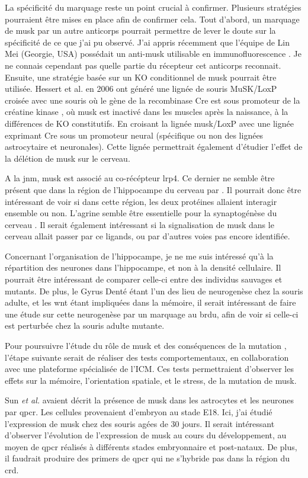 La spécificité du marquage reste un point crucial à confirmer. Plusieurs stratégies pourraient être mises en place afin de confirmer cela. Tout d'abord, un marquage de \gls{musk} par un autre anticorps pourrait permettre de lever le doute sur la spécificité de ce que j'ai pu observé. J'ai appris récemment que l'équipe de Lin Mei (Georgie, USA) possédait un anti-\gls{musk} utilisable en immunofluorescence \cite{Amenta2012}. Je ne connais cependant pas quelle partie du récepteur cet anticorps reconnait. Ensuite, une stratégie basée sur un KO conditionnel de \gls{musk} pourrait être utilisée. Hessert et al. en 2006 ont généré une lignée de souris MuSK/LoxP croisée avec une souris où le gène de la recombinase Cre est sous promoteur de la créatine kinase \cite{Hesser2006}, où \gls{musk} est inactivé dans les muscles après la naissance, à la différences de KO constitutifs. En croisant la lignée \gls{musk}/LoxP avec une lignée exprimant Cre sous un promoteur neural (spécifique ou non des lignées astrocytaire et neuronales). Cette lignée permettrait également d'étudier l'effet de la délétion de \gls{musk} sur le cerveau.

A la \gls{jnm}, \gls{musk} est associé au co-récépteur \gls{lrp}4. Ce dernier ne semble être présent que dans la région de l'hippocampe du cerveau par \cite{Sun2016}. Il pourrait donc être intéressant de voir si dans cette région, les deux protéines allaient interagir ensemble ou non. L'agrine semble être essentielle pour la synaptogénèse du cerveau \cite{Cohen1997}. Il serait également intéressant si la signalisation de \gls{musk} dans le cerveau allait passer par ce ligands, ou par d'autres voies pas encore identifiée.

Concernant l'organisation de l'hippocampe, je ne me suis intéressé qu'à la répartition des neurones dans l'hippocampe, et non à la densité cellulaire. Il pourrait être intéressant de comparer celle-ci entre des individus sauvages et mutants. De plus, le Gyrus Denté étant l'un des lieu de neurogenèse chez la souris adulte, et les \gls{wnt} étant impliquées dans la mémoire, il serait intéressant de faire une étude sur cette neurogenèse par un marquage au \gls{brdu}, afin de voir si celle-ci est perturbée chez la souris adulte mutante.

Pour poursuivre l'étude du rôle de \gls{musk} et des conséquences de la mutation \mcrd, l'étape suivante serait de réaliser des tests comportementaux, en collaboration avec une plateforme spécialisée de l'ICM. Ces tests permettraient d'observer les effets sur la mémoire, l'orientation spatiale, et le stress, de la mutation de \gls{musk}.

Sun \emph{et al.} avaient décrit la présence de \gls{musk} dans les astrocytes et les neurones par \gls{qpcr}. Les cellules provenaient d'embryon au stade E18. Ici, j'ai étudié l'expression de \gls{musk} chez des souris agées de 30 jours. Il serait intéressant d'observer l'évolution de l'expression de \gls{musk} au cours du développement, au moyen de \gls{qpcr} réalisés à différents stades embryonnaire et post-nataux. De plus, il faudrait produire des primers de \gls{qpcr} qui ne s'hybride pas dans la région du \gls{crd}.